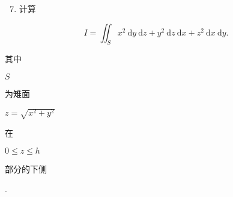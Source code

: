 \documentclass[10pt]{article}
\begin{document}
\begin{enumerate}
  \setcounter{enumi}{6}
  \item \begin{CJK}{UTF8}{mj}计算\end{CJK}
\end{enumerate}
$$
I=\iint_{S} x^{2} \mathrm{~d} y \mathrm{~d} z+y^{2} \mathrm{~d} z \mathrm{~d} x+z^{2} \mathrm{~d} x \mathrm{~d} y .
$$
\begin{CJK}{UTF8}{mj}其中\end{CJK} $S$ \begin{CJK}{UTF8}{mj}为雉面\end{CJK} $z=\sqrt{x^{2}+y^{2}}$ \begin{CJK}{UTF8}{mj}在\end{CJK} $0 \leq z \leq h$ \begin{CJK}{UTF8}{mj}部分的下侧\end{CJK}.
\end{document}
